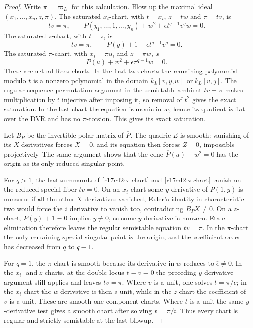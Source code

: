\begin{proof}
Write $\pi=\varpi_L$ for this calculation. Blow up the
maximal ideal $(x_1,\ldots,x_n,z,\pi)$.
The saturated $x_i$-chart, with $t=x_i$, $z=tw$ and
$\pi=tv$, is
\[
   tv=\pi,\qquad
   P(y_1,\ldots,1,\ldots,y_n)+w^2
                     +\epsilon t^{q-1}v^q w=0.
 \tag{CD217.4}\label{r17cd2:x-chart}
\]
The saturated $z$-chart, with $t=z$, is
\[
          tv=\pi,\qquad
          P(y)+1+\epsilon t^{q-1}v^q=0.
 \tag{CD217.5}\label{r17cd2:z-chart}
\]
The saturated $\pi$-chart, with $x_i=\pi u_i$ and
$z=\pi w$, is
\[
                  P(u)+w^2+\epsilon\pi^{q-1}w=0.
 \tag{CD217.6}\label{r17cd2:pi-chart}
\]
These are actual Rees charts. In the first two charts
the remaining polynomial modulo $t$ is a nonzero
polynomial in the domain $k_L[v,y,w]$ or $k_L[v,y]$.
The regular-sequence permutation argument in the
semistable ambient $tv=\pi$ makes multiplication by $t$
injective after imposing it, so removal of $t^2$ gives
the exact saturation. In the last chart the equation is
monic in $w$, hence its quotient is flat over the DVR
and has no $\pi$-torsion. This gives its exact saturation.

Let $B_P$ be the invertible polar matrix of $\overline P$.
The quadric $E$ is smooth: vanishing of its $X$ derivatives
forces $X=0$, and its equation then forces $Z=0$,
impossible projectively. The same argument shows that
the cone $\overline P(u)+w^2=0$ has the origin as its
only reduced singular point.

For $q>1$, the last summands of
\eqref{r17cd2:x-chart} and \eqref{r17cd2:z-chart} vanish
on the reduced special fiber $tv=0$. On an $x_i$-chart
some $y$ derivative of $\overline P(1,y)$ is nonzero:
if all the other $X$ derivatives vanished, Euler's
identity in characteristic two would force the $i$
derivative to vanish too, contradicting $B_PX\ne0$.
On a $z$-chart, $\overline P(y)+1=0$ implies $y\ne0$,
so some $y$ derivative is nonzero. Etale elimination
therefore leaves the regular semistable equation
$tv=\pi$. In the $\pi$-chart the only remaining special
singular point is the origin, and the coefficient order
has decreased from $q$ to $q-1$.

For $q=1$, the $\pi$-chart is smooth because its derivative
in $w$ reduces to $\overline\epsilon\ne0$.
In the $x_i$- and $z$-charts, at the double locus
$t=v=0$ the preceding $y$-derivative argument still
applies and leaves $tv=\pi$. Where $v$ is a unit,
one solves $t=\pi/v$; in the $x_i$-chart the $w$
derivative is then a unit, while in the $z$-chart the
coefficient of $v$ is a unit. These are smooth
one-component charts. Where $t$ is a unit the same
$y$-derivative test gives a smooth chart after solving
$v=\pi/t$. Thus every chart is regular and strictly
semistable at the last blowup.


\end{proof}
